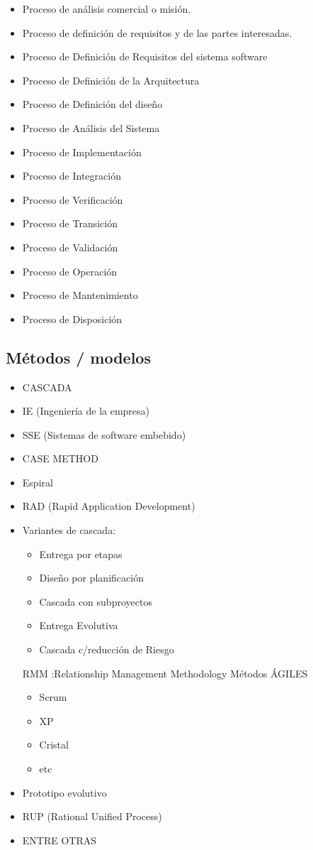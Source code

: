 \documentclass{templateNote}
\begin{document}
\begin{itemize}
    \item Proceso de análisis comercial o misión.
    \item Proceso de definición de requisitos y de las partes interesadas.
    \item Proceso de Definición de Requisitos del sistema software
    \item Proceso de Definición de la Arquitectura
    \item Proceso de Definición del diseño
    \item Proceso de Análisis del Sistema
    \item Proceso de Implementación
    \item Proceso de Integración
    \item Proceso de Verificación
    \item Proceso de Transición
    \item Proceso de Validación
    \item Proceso de Operación
    \item Proceso de Mantenimiento
    \item Proceso de Disposición
\end{itemize}

\subsection{Métodos / modelos}

\begin{itemize}
    \item CASCADA
    \item IE (Ingeniería de la empresa)
    \item SSE (Sistemas de software embebido)
    \item CASE METHOD
    \item Espiral 
    \item RAD (Rapid Application Development)
    \item Variantes de cascada:
    \begin{itemize}
        \item Entrega por etapas
        \item Diseño por planificación
        \item Cascada con subproyectos
        \item Entrega Evolutiva
        \item Cascada c/reducción de Riesgo
    \end{itemize}
    RMM :Relationship Management Methodology
    Métodos ÁGILES
    \begin{itemize}
        \item Scrum
        \item XP
        \item Cristal
        \item etc
    \end{itemize}
    \item Prototipo evolutivo
    \item RUP (Rational Unified Process)
    \item ENTRE OTRAS
\end{itemize}
\end{document}
